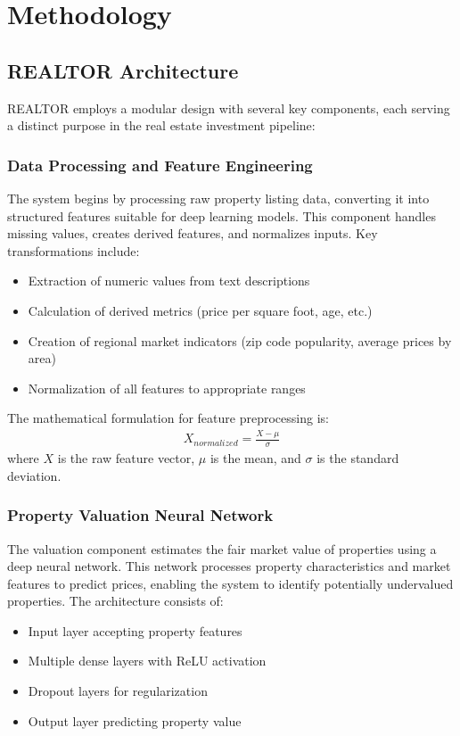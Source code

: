 \documentclass[conference]{IEEEtran}
\begin{document}
\section{Methodology}

\subsection{REALTOR Architecture}
REALTOR employs a modular design with several key components, each serving a distinct purpose in the real estate investment pipeline:

\subsubsection{Data Processing and Feature Engineering}
The system begins by processing raw property listing data, converting it into structured features suitable for deep learning models. This component handles missing values, creates derived features, and normalizes inputs. Key transformations include:

\begin{itemize}
\item Extraction of numeric values from text descriptions
\item Calculation of derived metrics (price per square foot, age, etc.)
\item Creation of regional market indicators (zip code popularity, average prices by area)
\item Normalization of all features to appropriate ranges
\end{itemize}

The mathematical formulation for feature preprocessing is:
\begin{align}
X_{normalized} = \frac{X - \mu}{\sigma}
\end{align}
where $X$ is the raw feature vector, $\mu$ is the mean, and $\sigma$ is the standard deviation.

\subsubsection{Property Valuation Neural Network}
The valuation component estimates the fair market value of properties using a deep neural network. This network processes property characteristics and market features to predict prices, enabling the system to identify potentially undervalued properties. The architecture consists of:

\begin{itemize}
\item Input layer accepting property features
\item Multiple dense layers with ReLU activation
\item Dropout layers for regularization
\item Output layer predicting property value
\end{itemize}
\end{document}
